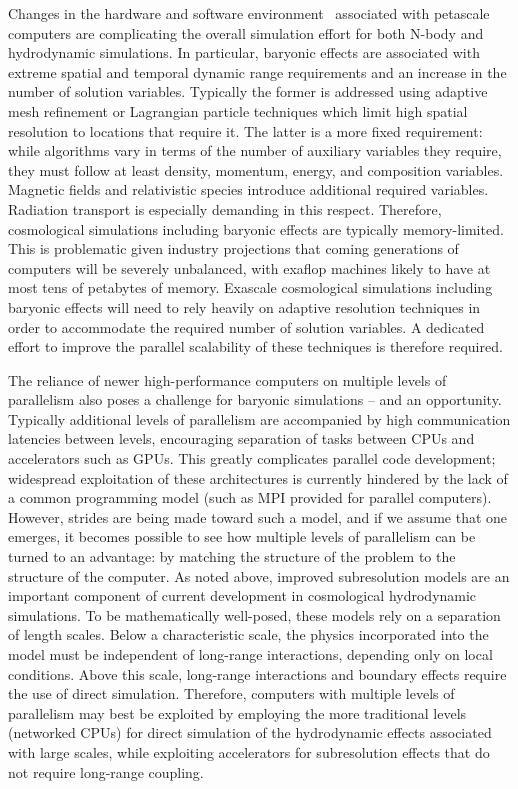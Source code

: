 \medskip


Changes in the hardware and software environment~\cite{microproc}
associated with petascale computers are complicating the overall
simulation effort for both N-body and hydrodynamic simulations. In
particular, baryonic effects are associated with extreme spatial and
temporal dynamic range requirements and an increase in the number of
solution variables. Typically the former is addressed using adaptive
mesh refinement or Lagrangian particle techniques which limit high
spatial resolution to locations that require it. The latter is a more
fixed requirement: while algorithms vary in terms of the number of
auxiliary variables they require, they must follow at least density,
momentum, energy, and composition variables. Magnetic fields and
relativistic species introduce additional required
variables. Radiation transport is especially demanding in this
respect. Therefore, cosmological simulations including baryonic
effects are typically memory-limited. This is problematic given
industry projections that coming generations of computers will be
severely unbalanced, with exaflop machines likely to have at most tens
of petabytes of memory. Exascale cosmological simulations including
baryonic effects will need to rely heavily on adaptive resolution
techniques in order to accommodate the required number of solution
variables. A dedicated effort to improve the parallel scalability of
these techniques is therefore required.

The reliance of newer high-performance computers on multiple levels of
parallelism also poses a challenge for baryonic simulations -- and an
opportunity. Typically additional levels of parallelism are
accompanied by high communication latencies between levels,
encouraging separation of tasks between CPUs and accelerators such as
GPUs. This greatly complicates parallel code development; widespread
exploitation of these architectures is currently hindered by the lack
of a common programming model (such as MPI provided for parallel
computers). However, strides are being made toward such a model, and
if we assume that one emerges, it becomes possible to see how multiple
levels of parallelism can be turned to an advantage: by matching the
structure of the problem to the structure of the computer. As noted
above, improved subresolution models are an important component of
current development in cosmological hydrodynamic simulations. To be
mathematically well-posed, these models rely on a separation of length
scales. Below a characteristic scale, the physics incorporated into
the model must be independent of long-range interactions, depending
only on local conditions. Above this scale, long-range interactions
and boundary effects require the use of direct simulation. Therefore,
computers with multiple levels of parallelism may best be exploited by
employing the more traditional levels (networked CPUs) for direct
simulation of the hydrodynamic effects associated with large scales,
while exploiting accelerators for subresolution effects that do not
require long-range coupling.

